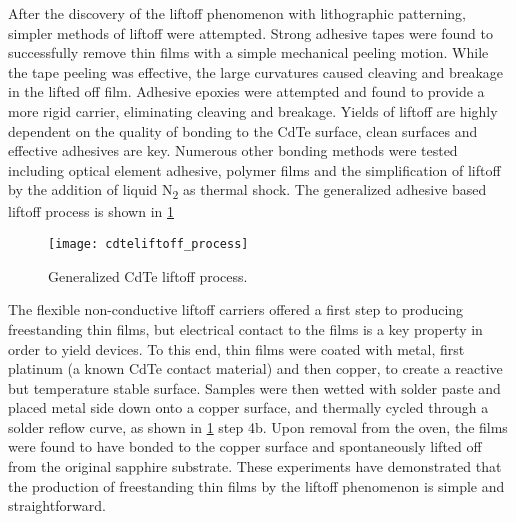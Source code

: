 After the discovery of the liftoff phenomenon with lithographic patterning, simpler methods of liftoff were attempted.
Strong adhesive tapes were found to successfully remove thin films with a simple mechanical peeling motion.
While the tape peeling was effective, the large curvatures caused cleaving and breakage in the lifted off film.
Adhesive epoxies were attempted and found to provide a more rigid carrier, eliminating cleaving and breakage.
Yields of liftoff are highly dependent on the quality of bonding to the CdTe surface, clean surfaces and effective adhesives are key.
Numerous other bonding methods were tested including optical element adhesive, polymer films and the simplification of liftoff by the addition of liquid N\textsubscript{2} as thermal shock.
The generalized adhesive based liftoff process is shown in \cref{fig:cdteliftoff_process}
\begin{figure}
 \centering \texttt{[image: cdteliftoff\_process]}
 \caption{\label{fig:cdteliftoff_process}Generalized CdTe liftoff process.}
\end{figure}
The flexible non-conductive liftoff carriers offered a first step to producing freestanding thin films, but electrical contact to the films is a key property in order to yield devices.
To this end, thin films were coated with metal, first platinum (a known CdTe contact material) and then copper, to create a reactive but temperature stable surface.
Samples were then wetted with solder paste and placed metal side down onto a copper surface, and thermally cycled through a solder reflow curve, as shown in \cref{fig:cdteliftoff_process} step 4b.
Upon removal from the oven, the films were found to have bonded to the copper surface and spontaneously lifted off from the original sapphire substrate.
These experiments have demonstrated that the production of freestanding thin films by the liftoff phenomenon is simple and straightforward.

